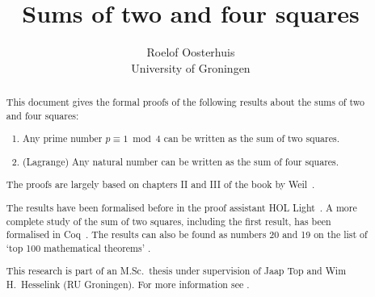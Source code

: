 \documentclass[11pt,a4paper,twoside]{article}
\begin{document}
\title{Sums of two and four squares}
\author{Roelof Oosterhuis\\University of Groningen}
\maketitle

\begin{abstract}
This document gives the formal proofs of the following results about the sums of two and four squares:
\begin{enumerate}
\item Any prime number $p \equiv 1 \bmod 4$ can be written as the sum of two squares.
\item (Lagrange) Any natural number can be written as the sum of four squares.
\end{enumerate}
The proofs are largely based on chapters II and III of the book by
Weil~\cite{Weil}.

The results %
have been formalised before in the proof assistant HOL Light~\cite{HOLLight}. A more complete study of the sum of two squares, including the first result, has been formalised in Coq~\cite{Thery}.
The results can also be found as numbers 20 and 19 on the list of `top 100 mathematical theorems' \cite{Wiedijk100}.

This research is part of an M.Sc.~thesis under supervision of Jaap Top
and Wim H.~Hesselink (RU Groningen). For more information see
\cite{Oosterhuis-MSc}.
\end{abstract}
\thispagestyle{empty}
\clearpage

\tableofcontents
{}







\end{document}
